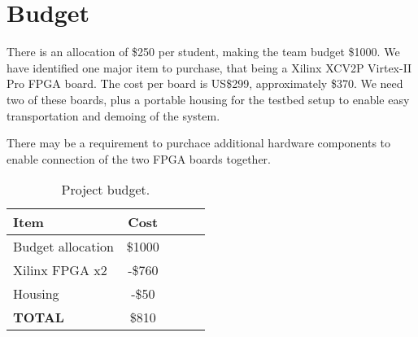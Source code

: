 \section{Budget}

There is an allocation of \$250 per student, making the team budget
\$1000. We have identified one major item to purchase,
that being a Xilinx XCV2P Virtex-II Pro FPGA board. The cost per board is
US\$299, approximately \$370. We need two of these boards, plus a portable housing for the testbed setup to enable easy transportation and demoing of the system.

There may be a requirement to purchace additional hardware components to enable connection of the two FPGA boards together.

\begin{table}[h]
\begin{tabular}{|l|c|c|c|c|}
  \hline
  \textbf{Item} & \textbf{Cost} \\
  \hline
  \hline
  Budget allocation & \$1000 \\
  \hline
  Xilinx FPGA x2 & -\$760 \\
  \hline
  Housing & -\$50 \\
  \hline
  \hline
  \textbf{TOTAL} & \$810 \\
  \hline
\end{tabular}
\caption{Project budget. }
 \label{budget}
\end{table}


